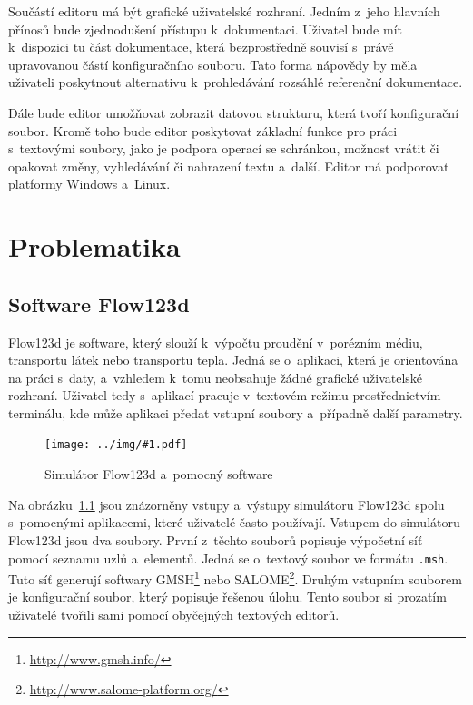 \documentclass[FM,bw,DP]{tulthesis}
\newcommand{\includeimg}[2]{%
\begin{figure}[h]
	\centering
    \texttt{[image: ../img/\#1.pdf]}
    \caption{#2}
	\label{img:#1}
\end{figure}
}
\begin{document}
Součástí editoru má být grafické uživatelské rozhraní. Jedním z~jeho hlavních přínosů bude zjednodušení přístupu k~dokumentaci. Uživatel bude mít k~dispozici tu část dokumentace, která bezprostředně souvisí s~právě upravovanou částí konfiguračního souboru. Tato forma nápovědy by měla uživateli poskytnout alternativu k~prohledávání rozsáhlé referenční dokumentace.

Dále bude editor umožňovat zobrazit datovou strukturu, která tvoří konfigurační soubor. Kromě toho bude editor poskytovat základní funkce pro práci s~textovými soubory, jako je podpora operací se schránkou, možnost vrátit či opakovat změny, vyhledávání či nahrazení textu a~další. Editor má podporovat platformy Windows a~Linux.



\chapter{Problematika}





\section{Software Flow123d}

Flow123d je software, který slouží k~výpočtu proudění v~porézním médiu, transportu látek nebo transportu tepla. Jedná se o~aplikaci, která je orientována na práci s~daty, a~vzhledem k~tomu neobsahuje žádné grafické uživatelské rozhraní. Uživatel tedy s~aplikací pracuje v~textovém režimu prostřednictvím terminálu, kde může aplikaci předat vstupní soubory a~případně další parametry.

\includeimg{flow123d}{Simulátor Flow123d a~pomocný software}

Na obrázku~\ref{img:flow123d} jsou znázorněny vstupy a~výstupy simulátoru Flow123d spolu s~pomocnými aplikacemi, které uživatelé často používají. Vstupem do simulátoru Flow123d jsou dva soubory. První z~těchto souborů popisuje výpočetní síť pomocí seznamu uzlů a~elementů. Jedná se o~textový soubor ve formátu \texttt{.msh}. Tuto síť generují softwary GMSH\footnote{\url{http://www.gmsh.info/}} nebo SALOME\footnote{\url{http://www.salome-platform.org/}}. Druhým vstupním souborem je konfigurační soubor, který popisuje řešenou úlohu. Tento soubor si prozatím uživatelé tvořili sami pomocí obyčejných textových editorů.
\end{document}
